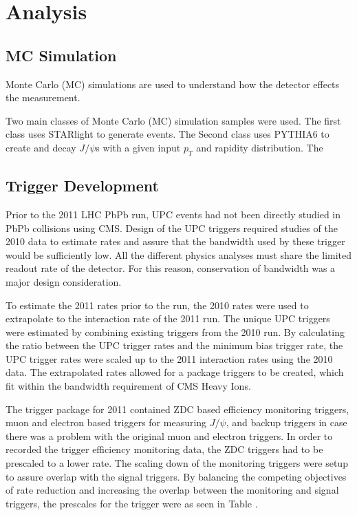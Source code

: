 \chapter{Analysis}	
  \section{MC Simulation}
    Monte Carlo (MC) simulations are used to understand how the detector 
      effects the measurement.


    Two main classes of Monte Carlo (MC) simulation samples were used. 
    The first class uses STARlight to generate events. 
    The Second class uses PYTHIA6 to create and decay $J/\psi$s with a given
      input $p_{T}$ and rapidity distribution. 
    The 

  \section{\label{sec:TrigDev} Trigger Development} 
    Prior to the 2011 LHC PbPb run, UPC events had not been directly studied in 
      PbPb collisions using CMS. 
    Design of the UPC triggers required studies of the 2010 data to estimate 
      rates and assure that the bandwidth used by these trigger would be
      sufficiently low. 
    All the different physics analyses must share the limited readout rate of 
      the detector.
    For this reason, conservation of bandwidth was a major design consideration.

    To estimate the 2011 rates prior to the run, the 2010 rates were used to 
      extrapolate to the interaction rate of the 2011 run. 
    The unique UPC triggers were estimated by combining existing triggers from
      the 2010 run. 
    By calculating the ratio between the UPC trigger rates and the minimum bias
      trigger rate, the UPC trigger rates were scaled up to the 2011 
      interaction rates using the 2010 data. 
    The extrapolated rates allowed for a package triggers to be created, which 
      fit within the bandwidth requirement of CMS Heavy Ions. 
    
    The trigger package for 2011 contained ZDC based efficiency monitoring 
      triggers, muon and electron based triggers for measuring $J/\psi$, and 
      backup triggers in case there was a problem with the original muon and 
      electron triggers.
    In order to recorded the trigger efficiency monitoring data, the ZDC 
      triggers had to be prescaled to a lower rate. 
    The scaling down of the monitoring triggers were setup to assure overlap
      with the signal triggers.
    By balancing the competing objectives of rate reduction and increasing 
      the overlap between the monitoring and signal triggers, 
      the prescales for the trigger were as seen in Table .%

